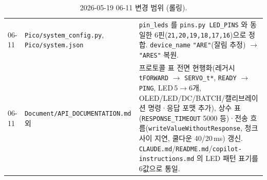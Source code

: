\documentclass[11pt, oneside]{article}
\begin{document}
\begin{table}[h]
\begin{tabularx}{\linewidth}{@{}llX@{}}
06-11 & \texttt{Pico/system\_config.py}, \texttt{Pico/system.json} & \texttt{pin\_leds} 를 \texttt{pins.py LED\_PINS} 와 동일한 6핀(\texttt{21,20,19,18,17,16})으로 정합. \texttt{device\_name} \texttt{"ARE"}(잘림 추정) $\to$ \texttt{"ARES"} 복원. \\
06-11 & \texttt{Document/API\_DOCUMENTATION.md} 외 & 프로토콜 표 전면 현행화(레거시 \texttt{tFORWARD} $\to$ \texttt{SERVO\_t*}, \texttt{READY} $\to$ \texttt{PING}, LED\,5$\to$6개, OLED/LED/DC/BATCH/캘리브레이션 명령·응답 포맷 추가), 상수 표(\texttt{RESPONSE\_TIMEOUT} 5000 등)·전송 흐름(\texttt{writeValueWithoutResponse}, 청크 사이 지연, 쿨다운 40/20\,ms) 갱신. \texttt{CLAUDE.md}/\texttt{README.md}/\texttt{copilot-instructions.md} 의 LED 패턴 표기를 6값으로 통일. \\
\bottomrule
\end{tabularx}
\caption{2026-05-19 \textendash{} 06-11 변경 범위 (롤링).}
\end{table}
\end{document}
